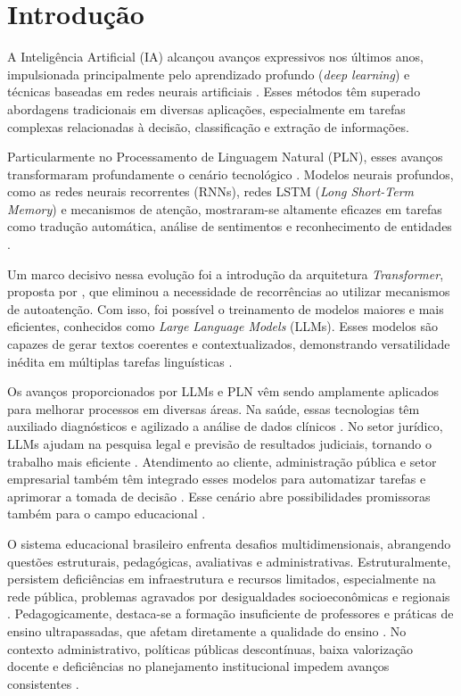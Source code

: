 \chapter{Introdução}

A Inteligência Artificial (IA) alcançou avanços expressivos nos últimos anos, impulsionada principalmente pelo aprendizado profundo (\textit{deep learning}) e técnicas baseadas em redes neurais artificiais \cite{young_recent_2018, otter_survey_2021}. Esses métodos têm superado abordagens tradicionais em diversas aplicações, especialmente em tarefas complexas relacionadas à decisão, classificação e extração de informações.

Particularmente no Processamento de Linguagem Natural (PLN), esses avanços transformaram profundamente o cenário tecnológico \cite{torfi_natural_2021}. Modelos neurais profundos, como as redes neurais recorrentes (RNNs), redes LSTM (\textit{Long Short-Term Memory}) e mecanismos de atenção, mostraram-se altamente eficazes em tarefas como tradução automática, análise de sentimentos e reconhecimento de entidades \cite{young_recent_2018, otter_survey_2021}.

Um marco decisivo nessa evolução foi a introdução da arquitetura \textit{Transformer}, proposta por , que eliminou a necessidade de recorrências ao utilizar mecanismos de autoatenção. Com isso, foi possível o treinamento de modelos maiores e mais eficientes, conhecidos como \textit{Large Language Models} (LLMs). Esses modelos são capazes de gerar textos coerentes e contextualizados, demonstrando versatilidade inédita em múltiplas tarefas linguísticas \cite{chen_evaluating_2021}.

Os avanços proporcionados por LLMs e PLN vêm sendo amplamente aplicados para melhorar processos em diversas áreas. Na saúde, essas tecnologias têm auxiliado diagnósticos e agilizado a análise de dados clínicos \cite{paixao_machine_2022}. No setor jurídico, LLMs ajudam na pesquisa legal e previsão de resultados judiciais, tornando o trabalho mais eficiente \cite{lai_large_2024}. Atendimento ao cliente, administração pública e setor empresarial também têm integrado esses modelos para automatizar tarefas e aprimorar a tomada de decisão \cite{pessanha_large_2024}. Esse cenário abre possibilidades promissoras também para o campo educacional \cite{shahzad_comprehensive_2025}.

O sistema educacional brasileiro enfrenta desafios multidimensionais, abrangendo questões estruturais, pedagógicas, avaliativas e administrativas. Estruturalmente, persistem deficiências em infraestrutura e recursos limitados, especialmente na rede pública, problemas agravados por desigualdades socioeconômicas e regionais \cite{carnaval_desigualdade_2021}. Pedagogicamente, destaca-se a formação insuficiente de professores e práticas de ensino ultrapassadas, que afetam diretamente a qualidade do ensino \cite{gatti_formacao_2017}. No contexto administrativo, políticas públicas descontínuas, baixa valorização docente e deficiências no planejamento institucional impedem avanços consistentes \cite{silva_politicas_2020}.

